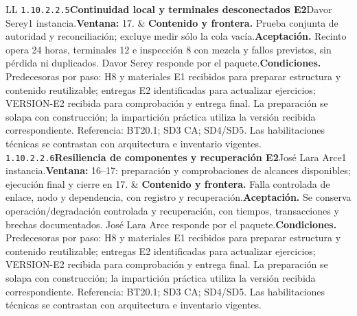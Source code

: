 \begin{longtable}{L{\tabcolsep\relax}L{\tabcolsep\relax}}
\texttt{1.\allowbreak{}10.\allowbreak{}2.\allowbreak{}2.\allowbreak{}5}\newline{}\textbf{Continuidad local y terminales desconectados E2}\newline{}Davor Serey\newline{}1 instancia.\newline{}\textbf{Ventana:} 17. & \textbf{Contenido y frontera.} Prueba conjunta de autoridad y reconciliación; excluye medir sólo la cola vacía.\newline{}\textbf{Aceptación.} Recinto opera 24 horas, terminales 12 e inspección 8 con mezcla y fallos previstos, sin pérdida ni duplicados. Davor Serey responde por el paquete.\newline{}\textbf{Condiciones.} Predecesoras por paso: H8 y materiales E1 recibidos para preparar estructura y contenido reutilizable; entregas E2 identificadas para actualizar ejercicios; VERSION-E2 recibida para comprobación y entrega final. La preparación se solapa con construcción; la impartición práctica utiliza la versión recibida correspondiente. Referencia: BT20.1; SD3 CA; SD4/SD5. Las habilitaciones técnicas se contrastan con arquitectura e inventario vigentes.\\\hline
\texttt{1.\allowbreak{}10.\allowbreak{}2.\allowbreak{}2.\allowbreak{}6}\newline{}\textbf{Resiliencia de componentes y recuperación E2}\newline{}José Lara Arce\newline{}1 instancia.\newline{}\textbf{Ventana:} 16--17: preparación y comprobaciones de alcances disponibles; ejecución final y cierre en 17. & \textbf{Contenido y frontera.} Falla controlada de enlace, nodo y dependencia, con registro y recuperación.\newline{}\textbf{Aceptación.} Se conserva operación/degradación controlada y recuperación, con tiempos, transacciones y brechas documentados. José Lara Arce responde por el paquete.\newline{}\textbf{Condiciones.} Predecesoras por paso: H8 y materiales E1 recibidos para preparar estructura y contenido reutilizable; entregas E2 identificadas para actualizar ejercicios; VERSION-E2 recibida para comprobación y entrega final. La preparación se solapa con construcción; la impartición práctica utiliza la versión recibida correspondiente. Referencia: BT20.1; SD3 CA; SD4/SD5. Las habilitaciones técnicas se contrastan con arquitectura e inventario vigentes.\\\hline

\end{longtable}
